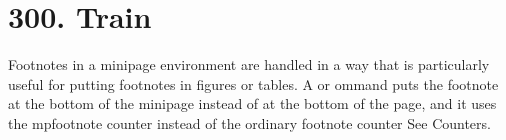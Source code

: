 \section{300. Train}
\begin{center}
\begin{minipage}{12cm}
	Footnotes in a minipage environment are handled in a way that is particularly useful for putting footnotes in figures or tables. A or ommand puts the footnote at the bottom of the minipage instead of at the bottom of the page, and it uses the mpfootnote counter instead of the ordinary footnote counter See Counters. 
\end{minipage}
\end{center}

